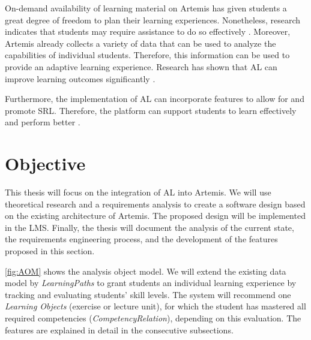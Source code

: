 \documentclass[a4paper,12pt,twoside]{article}
\begin{document}
On-demand availability of learning material on Artemis has given students a great degree of freedom to plan their learning experiences. Nonetheless, research
indicates that students may require assistance to do so effectively \cite{latham1991self}. Moreover, Artemis already collects a variety of data that can be used to analyze
the capabilities of individual students. Therefore, this information can be used to provide an adaptive learning experience. Research has shown that
\ac{AL} can improve learning outcomes significantly \cite{liu2017investigating}.

Furthermore, the implementation of \ac{AL} can incorporate features to allow for and promote \ac{SRL}. Therefore, the platform can support students to learn
effectively and perform better \cite{anthonysamy2020self}.


\section{Objective}

This thesis will focus on the integration of \ac{AL} into Artemis.
We will use theoretical research and a requirements analysis to create a software design based on the existing architecture of Artemis. The proposed
design will be implemented in the \ac{LMS}. Finally, the thesis will document the analysis of the current state, the requirements engineering process,
and the development of the features proposed in this section.

\autoref{fig:AOM} shows the analysis object model. We will extend the existing data model by \textit{LearningPaths} to grant students
an individual learning experience by tracking and evaluating students' skill levels. The system will recommend one \textit{Learning Objects}
(exercise or lecture unit), for which the student has mastered all required competencies (\textit{CompetencyRelation}), depending on this evaluation.
The features are explained in detail in the consecutive subsections.
\end{document}
